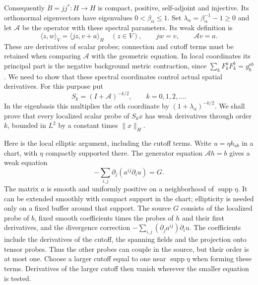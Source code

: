 Consequently $B=jj^*:H\to H$ is compact, positive, self-adjoint and
injective.  Its orthonormal eigenvectors have eigenvalues $0<\beta_\alpha
\leq1$.  Set $\lambda_\alpha=\beta_\alpha^{-1}-1\geq0$ and let
$\mathcal A$ be the operator with these spectral parameters.  Its weak
definition is
\[
 \langle z,w\rangle_V=\langle jz,v+a\rangle_H\quad(z\in V),
 \qquad jw=v,\qquad \mathcal Av=a.
\]
These are derivatives of scalar probes; connection and cutoff terms
must be retained when comparing $\mathcal A$ with the geometric equation.
In local coordinates its principal part is the negative background
metric contraction, since $\sum_k F_k^aF_k^b=g_0^{ab}$.
We need to show that these spectral coordinates control actual spatial
derivatives.  For this purpose put
\[
 S_k=(I+\mathcal A)^{-k/2},\qquad k=0,1,2,\ldots.
\]
In the eigenbasis this multiplies the $\alpha$th coordinate by
$(1+\lambda_\alpha)^{-k/2}$.  We shall prove that every localized scalar
probe of $S_kx$ has weak derivatives through order $k$, bounded in $L^2$
by a constant times $\|x\|_H$.

Here is the local elliptic argument, including the cutoff terms.
Write $u=\eta h_{ab}$ in a chart, with $\eta$ compactly supported there.
The generator equation $\mathcal Ah=b$ gives a weak equation
\begin{equation}\label{eq:rf-local-divergence}
 -\sum_{i,j}\partial_j(a^{ij}\partial_i u)=G.
\end{equation}
The matrix $a$ is smooth and uniformly positive on a neighborhood of
$\operatorname{supp}\eta$.  It can be extended smoothly with compact
support in the chart; ellipticity is needed only on a fixed buffer
around that support.  The source $G$ consists of the localized probe of
$b$, fixed smooth coefficients times the probes of $h$ and their first
derivatives, and the divergence correction
$-\sum_{i,j}(\partial_j a^{ij})\partial_i u$.
The coefficients include the derivatives of the cutoff, the spanning
fields and the projection onto tensor probes.  Thus the other probes
can couple in the source, but their order is at most one.  Choose a
larger cutoff equal to one near $\operatorname{supp}\eta$ when forming
these terms.  Derivatives of the larger cutoff then vanish wherever
the smaller equation is tested.

